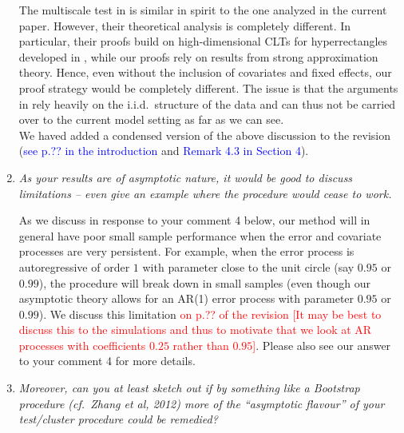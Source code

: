 \documentclass[a4paper,12pt]{article}
\begin{document}
\begin{enumerate}[label=\arabic*.,leftmargin=0.6cm]
The multiscale test in \cite{KhismatullinaVogt2021} is similar in spirit to the one analyzed in the current paper. However, their theoretical analysis is completely different. In particular, their proofs build on high-dimensional CLTs for hyperrectangles developed in \cite{Chernozhukov2017}, while our proofs rely on results from strong approximation theory. Hence, even without the inclusion of covariates and fixed effects, our proof strategy would be completely different. The issue is that the arguments in \cite{KhismatullinaVogt2021} rely heavily on the i.i.d.\ structure of the data and can thus not be carried over to the current model setting as far as we can see. \\
We haved added a condensed version of the above discussion to the revision (\textcolor{blue}{see p.?? in the introduction} and \textcolor{blue}{Remark 4.3 in Section 4}). 


\item \textit{As your results are of asymptotic nature, it would be good to discuss limitations -- even give an example where the procedure would cease to work.}  

As we discuss in response to your comment 4 below, our method will in general have poor small sample performance when the error and covariate processes are very persistent. For example, when the error process is autoregressive of order $1$ with parameter close to the unit circle (say $0.95$ or $0.99$), the procedure will break down in small samples (even though our asymptotic theory allows for an AR(1) error process with parameter $0.95$ or $0.99$). We discuss this limitation \textcolor{red}{on p.?? of the revision [It may be best to discuss this to the simulations and thus to motivate that we look at AR processes with coefficients $0.25$ rather than $0.95$]}. Please also see our answer to your comment 4 for more details.
  

\item \textit{Moreover, can you at least sketch out if by something like a Bootstrap procedure (cf.\ Zhang et al, 2012) more of the ``asymptotic flavour'' of your test/cluster procedure could be remedied?}


\end{enumerate}
\end{document}
